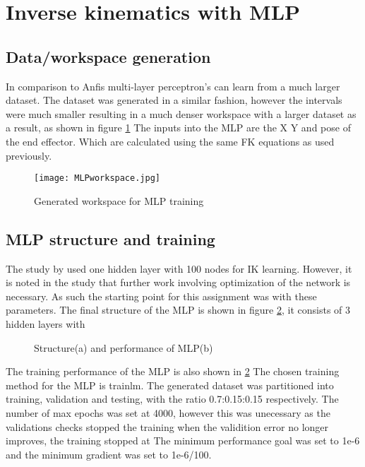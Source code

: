 \documentclass[a4paper,11pt]{article}
\begin{document}
\section{Inverse kinematics with MLP}
\subsection{Data/workspace generation}
In comparison to Anfis multi-layer perceptron’s can learn from a much larger dataset. The dataset was generated in a similar fashion, however the intervals were much smaller resulting in a much denser workspace with a larger dataset as a result, as shown in figure \ref{fig:MLPwork}
The inputs into the MLP are the X Y and pose of the end effector. Which are calculated using the same FK equations as used previously.
\begin{figure}[H]
\centering
  \texttt{[image: MLPworkspace.jpg]}
  \caption{Generated workspace for MLP training}
\label{fig:MLPwork}
\end{figure}


\subsection{MLP structure and training}
The study by \cite{mlp1} used one hidden layer with 100 nodes for IK learning. However, it is noted in the study that further work involving optimization of the network is necessary. As such the starting point for this assignment was with these parameters. 
The final structure of the MLP is shown in figure \ref{fig:MLPstr}, it consists of 3 hidden layers with

\begin{figure}[H]

\begin{minipage}{.5\linewidth}
\centering
{}
\end{minipage}
\begin{minipage}{.5\linewidth}
\centering
{}
\end{minipage}\par\medskip

\caption{Structure(a) and performance of MLP(b)}
\label{fig:MLPstr}
\end{figure}
The training performance of the MLP is also shown in \ref{fig:MLPstr} 
The chosen training method for the MLP is trainlm.
The generated dataset was partitioned into training, validation and testing, with the ratio 0.7:0.15:0.15 respectively. The number of max epochs was set at 4000, however this was unecessary as the validations checks stopped the training when the validition error no longer improves, the training stopped at %
 The minimum performance goal was set to 1e-6 and the minimum gradient was set to 1e-6/100.
\end{document}
